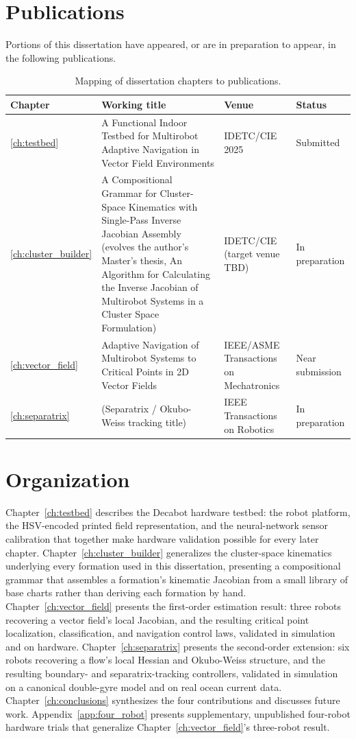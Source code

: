 \documentclass[12pt, letterpaper, oneside]{report}
\begin{document}
\section{Publications}

Portions of this dissertation have appeared, or are in preparation to appear,
in the following publications.

\begin{table}[h]
\centering
\caption{Mapping of dissertation chapters to publications.}
\begin{tabular}{p{0.6in} p{2.6in} p{1in} p{0.8in}}
\toprule
Chapter & Working title & Venue & Status \\
\midrule
\ref{ch:testbed} & A Functional Indoor Testbed for Multirobot Adaptive
  Navigation in Vector Field Environments & IDETC/CIE 2025 & Submitted \\
\ref{ch:cluster_builder} & A Compositional Grammar for Cluster-Space
  Kinematics with Single-Pass Inverse Jacobian Assembly (evolves the
  author's Master's thesis, An Algorithm for Calculating the Inverse
  Jacobian of Multirobot Systems in a Cluster Space Formulation) &
  IDETC/CIE (target venue TBD) & In preparation \\
\ref{ch:vector_field} & Adaptive Navigation of Multirobot Systems to
  Critical Points in 2D Vector Fields & IEEE/ASME Transactions on
  Mechatronics & Near submission \\
\ref{ch:separatrix} & (Separatrix / Okubo-Weiss tracking title) & IEEE
  Transactions on Robotics & In preparation \\
\bottomrule
\end{tabular}
\end{table}

\section{Organization}

Chapter~\ref{ch:testbed} describes the Decabot hardware testbed: the robot
platform, the HSV-encoded printed field representation, and the
neural-network sensor calibration that together make hardware validation
possible for every later chapter. Chapter~\ref{ch:cluster_builder}
generalizes the cluster-space kinematics underlying every formation used in
this dissertation, presenting a compositional grammar that assembles a
formation's kinematic Jacobian from a small library of base charts rather
than deriving each formation by hand. Chapter~\ref{ch:vector_field} presents
the first-order estimation result: three robots recovering a vector field's
local Jacobian, and the resulting critical point localization, classification,
and navigation control laws, validated in simulation and on hardware.
Chapter~\ref{ch:separatrix} presents the second-order extension: six robots
recovering a flow's local Hessian and Okubo-Weiss structure, and the
resulting boundary- and separatrix-tracking controllers, validated in
simulation on a canonical double-gyre model and on real ocean current data.
Chapter~\ref{ch:conclusions} synthesizes the four contributions and
discusses future work. Appendix~\ref{app:four_robot} presents supplementary,
unpublished four-robot hardware trials that generalize
Chapter~\ref{ch:vector_field}'s three-robot result.
\end{document}
